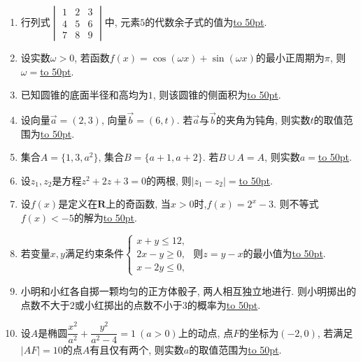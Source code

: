 \documentclass[10pt,a4paper]{article}
\newcommand{\blank}[1]{\underline{\hbox to #1pt{}}}
\begin{document}
\begin{enumerate}[1.]
\item 行列式$\begin{vmatrix} 1 & 2 & 3 \\ 4 & 5 & 6  \\ 7 & 8 & 9 \end{vmatrix}$中, 元素$5$的代数余子式的值为\blank{50}.
\item 设实数$\omega>0$, 若函数$f(x)=\cos(\omega x)+\sin(\omega x)$的最小正周期为$\pi$, 则$\omega=$\blank{50}.
\item 已知圆锥的底面半径和高均为$1$, 则该圆锥的侧面积为\blank{50}.
\item 设向量$\overrightarrow{a}=(2,3)$, 向量$\overrightarrow{b}=(6,t)$. 若$\overrightarrow{a}$与$\overrightarrow{b}$的夹角为钝角, 则实数$t$的取值范围为\blank{50}.
\item 集合$A=\{1,3,a^2\}$, 集合$B=\{a+1,a+2\}$. 若$B\cup A=A$, 则实数$a=$\blank{50}.
\item 设$z_1,z_2$是方程$z^2+2z+3=0$的两根, 则$|z_1-z_2|=$\blank{50}.
\item 设$f(x)$是定义在$\mathbf{R}$上的奇函数, 当$x>0$时,$f(x)=2^x-3$. 则不等式$f(x)<-5$的解为\blank{50}.
\item 若变量$x,y$满足约束条件$\begin{cases} x+y\le 12, \\ 2x-y\ge 0,  \\ x-2y\le 0, \end{cases}$ 则$z=y-x$的最小值为\blank{50}.
\item 小明和小红各自掷一颗均匀的正方体骰子, 两人相互独立地进行. 则小明掷出的点数不大于$2$或小红掷出的点数不小于$3$的概率为\blank{50}.
\item 设$A$是椭圆$\dfrac{x^2}{a^2}+\dfrac{y^2}{a^2-4}=1 \ (a>0)$上的动点, 点$F$的坐标为$(-2,0)$, 若满足$|AF|=10$的点$A$有且仅有两个, 则实数$a$的取值范围为\blank{50}.



\end{enumerate}
\end{document}
